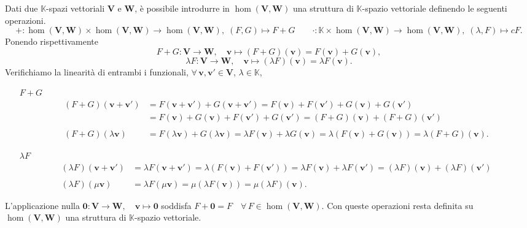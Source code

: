 \documentclass{article}
\theoremstyle{plain}
\theoremstyle{definition}
\theoremstyle{remark}
\begin{document}
\vspace{10pt}

Dati due $\mathbb{K}$-spazi vettoriali $\mathbf{V}$ e $\mathbf{W}$, è possibile introdurre in $\hom(\mathbf{V},\mathbf{W})$ una struttura di $\mathbb{K}$-spazio vettoriale definendo le seguenti operazioni.
\[+:\hom(\mathbf{V},\mathbf{W})\times\hom(\mathbf{V},\mathbf{W})\to\hom(\mathbf{V},\mathbf{W}),\; (F,G)\mapsto F+G\quad\quad \cdot:\mathbb{K}\times\hom(\mathbf{V},\mathbf{W})\to\hom(\mathbf{V},\mathbf{W}),\; (\lambda,F)\mapsto cF.\]
Ponendo rispettivamente
\[F+G:\mathbf{V}\to\mathbf{W},\quad \mathbf{v}\mapsto(F+G)(\mathbf{v})=F(\mathbf{v})+G(\mathbf{v}),\]
\[\lambda F:\mathbf{V}\to\mathbf{W},\quad \mathbf{v}\mapsto(\lambda F)(\mathbf{v})=\lambda F(\mathbf{v}).\]
Verifichiamo la linearità di entrambi i funzionali, $\forall\,\mathbf{v},\mathbf{v}'\in\mathbf{V}$, $\lambda\in\mathbb{K}$,
\begin{itemize}
    \item[$F+G$] 
    \begin{align*}
        (F+G)(\mathbf{v}+\mathbf{v}')&=F(\mathbf{v}+\mathbf{v}')+G(\mathbf{v}+\mathbf{v}')=F(\mathbf{v})+F(\mathbf{v}')+G(\mathbf{v})+G(\mathbf{v}')\\
        &=F(\mathbf{v})+G(\mathbf{v})+F(\mathbf{v}')+G(\mathbf{v}')=(F+G)(\mathbf{v})+(F+G)(\mathbf{v}')\\\\
        (F+G)(\lambda\mathbf{v})&=F(\lambda\mathbf{v})+G(\lambda\mathbf{v})=\lambda F(\mathbf{v})+\lambda G(\mathbf{v})=\lambda(F(\mathbf{v})+G(\mathbf{v}))=\lambda(F+G)(\mathbf{v}).
    \end{align*}
    \item[$\lambda F$]
    \begin{align*}
        (\lambda F)(\mathbf{v}+\mathbf{v}')&=\lambda F(\mathbf{v}+\mathbf{v}')=\lambda(F(\mathbf{v})+F(\mathbf{v}'))=\lambda F(\mathbf{v})+\lambda F(\mathbf{v}')=(\lambda F)(\mathbf{v})+(\lambda F)(\mathbf{v}')\\\\
        (\lambda F)(\mu\mathbf{v})&=\lambda F(\mu\mathbf{v})=\mu(\lambda F(\mathbf{v}))=\mu(\lambda F)(\mathbf{v}).
    \end{align*}
\end{itemize}
L'applicazione nulla \(\mathbf{0}:\mathbf{V}\to\mathbf{W},\quad \mathbf{v}\mapsto \mathbf{0}\)
soddisfa \(F+\mathbf{0}=F \quad\forall\,F\in\hom(\mathbf{V},\mathbf{W}).\)
Con queste operazioni resta definita su $\hom(\mathbf{V},\mathbf{W})$ una struttura di $\mathbb{K}$-spazio vettoriale.
\end{document}
